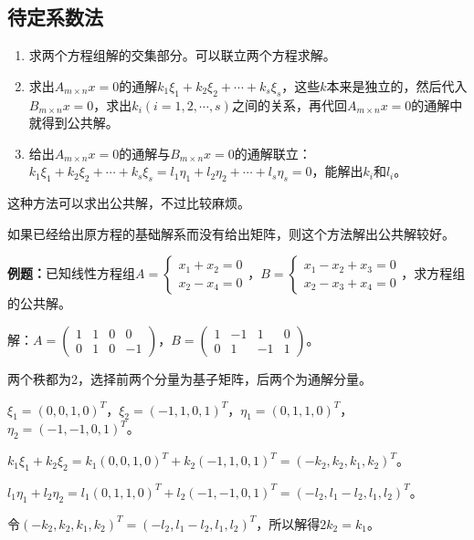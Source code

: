 \documentclass[UTF8, 12pt]{ctexart}
\begin{document}
\subsection{待定系数法}

\begin{enumerate}
\item 求两个方程组解的交集部分。可以联立两个方程求解。
\item 求出$A_{m\times n}x=0$的通解$k_1\xi_1+k_2\xi_2+\cdots+k_s\xi_s$，这些$k$本来是独立的，然后代入$B_{m\times n}x=0$，求出$k_i(i=1,2,\cdots,s)$之间的关系，再代回$A_{m\times n}x=0$的通解中就得到公共解。
\item 给出$A_{m\times n}x=0$的通解与$B_{m\times n}x=0$的通解联立：$k_1\xi_1+k_2\xi_2+\cdots+k_s\xi_s=l_1\eta_1+l_2\eta_2+\cdots+l_s\eta_s=0$，能解出$k_i$和$l_i$。
\end{enumerate}

这种方法可以求出公共解，不过比较麻烦。

如果已经给出原方程的基础解系而没有给出矩阵，则这个方法解出公共解较好。

\textbf{例题：}已知线性方程组$A=\left\{\begin{array}{l}
x_1+x_2=0 \\
x_2-x_4=0
\end{array}\right.$，$B=\left\{\begin{array}{l}
x_1-x_2+x_3=0 \\
x_2-x_3+x_4=0
\end{array}\right.$，求方程组的公共解。

解：$A=\left(\begin{array}{cccc}
1 & 1 & 0 & 0 \\
0 & 1 & 0 & -1
\end{array}\right)$，$B=\left(\begin{array}{cccc}
1 & -1 & 1 & 0 \\
0 & 1 & -1 & 1
\end{array}\right)$。\medskip

两个秩都为2，选择前两个分量为基子矩阵，后两个为通解分量。

$\xi_1=(0,0,1,0)^T$，$\xi_2=(-1,1,0,1)^T$，$\eta_1=(0,1,1,0)^T$，$\eta_2=(-1,-1,0,1)^T$。

$k_1\xi_1+k_2\xi_2=k_1(0,0,1,0)^T+k_2(-1,1,0,1)^T=(-k_2,k_2,k_1,k_2)^T$。

$l_1\eta_1+l_2\eta_2=l_1(0,1,1,0)^T+l_2(-1,-1,0,1)^T=(-l_2,l_1-l_2,l_1,l_2)^T$。

令$(-k_2,k_2,k_1,k_2)^T=(-l_2,l_1-l_2,l_1,l_2)^T$，所以解得$2k_2=k_1$。
\end{document}
